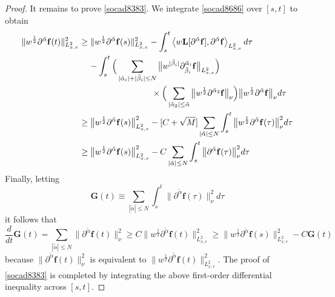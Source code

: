 \documentclass[reqno]{amsart}
\numberwithin{equation}{section}
\numberwithin{equation}{section}
\begin{document}
\begin{proof}
			It remains to prove \eqref{socad8383}. We integrate \eqref{socad8686} over $[s,t]$ to obtain
			\begin{gather*}
			\begin{aligned}
			\|w^{\frac{1}{2}} \partial^{\tilde{\alpha}} \mathbf{f}(t)\|_{L^{2}_{x,v}}^2
			 &\geq \|w^{\frac{1}{2}} \partial^{\tilde{\alpha}} \mathbf{f}(s)\|_{L^{2}_{x,v}}^2 - \int_s^t \left\langle w\mathbf{L}[\partial^{\tilde{\alpha}} \mathbf{f}], \partial^{\tilde{\alpha}} \mathbf{f} \right\rangle_{L^{2}_{x,v}} d \tau \\
			&\hspace{0.4cm}- \int_s^t \Big( \sum_{| \tilde{\alpha}_i |+| \tilde{\beta}_i | \leq N} \big\| w^{| \tilde{\beta}_i |} \partial_{\tilde{\beta}_i}^{\tilde{\alpha}_i} \mathbf{f}\big\|_{L^{2}_{x,v}} \Big)\\
			&\hspace{3cm}\times \Big( \sum_{|\tilde{\alpha}_2| \le \tilde{\alpha}} \big\|w^{\frac{1}{2}}\partial^{\tilde{\alpha}_2} \mathbf{f}\big\|_{\nu} \Big) \big\|w^{\frac{1}{2}}\partial^{\tilde{\alpha}} \mathbf{f}\big\|_{\nu} d \tau\\
			&\ge \big\|w^{\frac{1}{2}} \partial^{\tilde{\alpha}} \mathbf{f}(s)\big\|_{L^{2}_{x,v}}^2 - [C + \sqrt{M}] \sum_{|\tilde{\alpha}| \leq N} \int_s^t \big\|w^{\frac{1}{2}}\partial^{\tilde{\alpha}} \mathbf{f}(\tau)\big\|^2_{\nu} d\tau\\
			&\ge \big\|w^{\frac{1}{2}} \partial^{\tilde{\alpha}} \mathbf{f}(s)\big\|_{L^{2}_{x,v}}^2 - C \sum_{|\tilde{\alpha}| \leq N} \int_s^t  \big\|\partial^{\tilde{\alpha}} \mathbf{f}(\tau)\big\|_{\nu}^2 d\tau
			\end{aligned}
			\end{gather*}
			Finally, letting
			\begin{equation*}
				\mathbf{G}(t) \equiv \sum_{|\tilde{\alpha}| \le N} \int_s^t \big\|\partial^{\tilde{\alpha}} \mathbf{f}(\tau)\big\|_{\nu}^2 d\tau
			\end{equation*}
			it follows that
			\begin{equation*}
			\frac{d}{dt}	\mathbf{G}(t) = \sum_{|\tilde{\alpha}| \le N} \big\|\partial^{\tilde{\alpha}} \mathbf{f}(t)\big\|_{\nu}^2 \ge C \big\|w^{\frac{1}{2}}\partial^{\tilde{\alpha}} \mathbf{f}(t)\big\|_{L^{2}_{x,v}}^2 \ge \big\|w^{\frac{1}{2}}\partial^{\tilde{\alpha}} \mathbf{f}(s)\big\|_{L^{2}_{x,v}}^2 - C \mathbf{G}(t)
			\end{equation*}
			because $\|\partial^{\tilde{\alpha}} \mathbf{f}(t)\|_{\nu}^2$ is equivalent to $\|w^{\frac{1}{2}}\partial^{\tilde{\alpha}} \mathbf{f}(t)\|^2_{L^{2}_{x,v}}$. The proof of \eqref{socad8383} is completed by integrating the above first-order differential inequality across $[s,t]$. 
		\end{proof}
		
\end{document}
